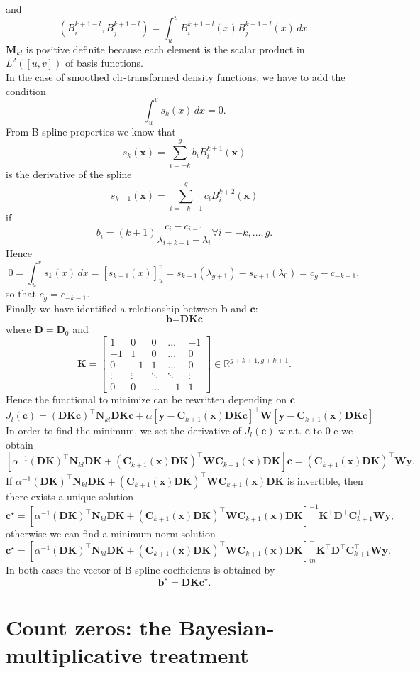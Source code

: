 and \[(B_{i}^{k+1-l}, B_{j}^{k+1-l}) = \int_u^v B_{i}^{k+1-l}(x)B_{j}^{k+1-l}(x) \, dx.\]
$\textbf{M}_{kl}$ is positive definite because each element is the scalar product in $L^2([u,v])$ of basis functions. \\
In the case of  smoothed clr-transformed density functions, we have to add the condition
\[\int_u^v s_k(x) \, dx = 0.\] 
From B-spline properties we know that 
\[  s_k(\textbf{x})=\sum\limits_{i=-k}^{g}b_iB_i^{k+1}(\textbf{x}) \]
is the derivative of the spline
\[  s_{k+1}(\textbf{x})=\sum\limits_{i=-k-1}^{g}c_iB_i^{k+2}(\textbf{x}) \]
if
\[b_i = (k+1)\frac{c_i-c_{i-1}}{\lambda_{i+k+1}-\lambda_{i}} \forall i = -k, \dots, g.\]
Hence 
\[ 0 = \int_u^v s_k(x) \, dx = [s_{k+1}(x)]_u^v = s_{k+1}(\lambda_{g+1})-s_{k+1}(\lambda_{0}) = c_g-c_{-k-1},\]
so that $c_g = c_{-k-1}$.\\
Finally we have identified a relationship between $\textbf{b}$ and $\textbf{c}$:
\[\textbf{b} = \textbf{D}\textbf{K}\textbf{c}\] 
where $ \textbf{D} = \textbf{D}_0$ and
\[  \textbf{K} =
\begin{bmatrix}
1 &0&0& \dots  & -1 \\
-1 &1&0& \dots  & 0 \\
0 &-1&1& \dots  & 0 \\
\vdots &\vdots & \ddots & \ddots& \vdots \\
0 &0 & \dots&-1  & 1
\end{bmatrix} \in \mathbb{R}^{g+k+1, g+k+1}. \]
Hence the functional to minimize can be rewritten depending on $\textbf{c}$
\[J_l(\textbf{c}) = (\textbf{D}\textbf{K}\textbf{c})^\top \textbf{N}_{kl}\textbf{D}\textbf{K}\textbf{c} + \alpha [\textbf{y}-\textbf{C}_{k+1}(\textbf{x})\textbf{D}\textbf{K}\textbf{c}]^\top \textbf{W} [\textbf{y}-\textbf{C}_{k+1}(\textbf{x})\textbf{D}\textbf{K}\textbf{c}]\]
In order to find the minimum, we set the derivative of $J_l(\textbf{c})$ w.r.t. $\textbf{c}$ to 0 e we obtain
\[ [\alpha^{-1}(\textbf{D}\textbf{K})^\top \textbf{N}_{kl} \textbf{D}\textbf{K}+ (\textbf{C}_{k+1}(\textbf{x})\textbf{D}\textbf{K})^\top\textbf{W}\textbf{C}_{k+1}(\textbf{x})\textbf{D}\textbf{K}]\textbf{c} = (\textbf{C}_{k+1}(\textbf{x})\textbf{D}\textbf{K})^\top \textbf{W}\textbf{y}.\]
If $\alpha^{-1}(\textbf{D}\textbf{K})^\top \textbf{N}_{kl} \textbf{D}\textbf{K}+ (\textbf{C}_{k+1}(\textbf{x})\textbf{D}\textbf{K})^\top\textbf{W}\textbf{C}_{k+1}(\textbf{x})\textbf{D}\textbf{K}$ is invertible, then there exists a unique solution 
\[\textbf{c}^\star = [\alpha^{-1}(\textbf{D}\textbf{K})^\top \textbf{N}_{kl} \textbf{D}\textbf{K}+ (\textbf{C}_{k+1}(\textbf{x})\textbf{D}\textbf{K})^\top\textbf{W}\textbf{C}_{k+1}(\textbf{x})\textbf{D}\textbf{K}]^{-1}\textbf{K}^\top\textbf{D}^\top\textbf{C}_{k+1}^\top \textbf{W}\textbf{y},\]
otherwise we can find a minimum norm solution
\[\textbf{c}^\star = [\alpha^{-1}(\textbf{D}\textbf{K})^\top \textbf{N}_{kl} \textbf{D}\textbf{K}+ (\textbf{C}_{k+1}(\textbf{x})\textbf{D}\textbf{K})^\top\textbf{W}\textbf{C}_{k+1}(\textbf{x})\textbf{D}\textbf{K}]_{m}^{-}\textbf{K}^\top\textbf{D}^\top\textbf{C}_{k+1}^\top \textbf{W}\textbf{y}.\]
In both cases the vector of B-spline coefficients is obtained by
\[\textbf{b}^\star = \textbf{D}\textbf{K}\textbf{c}^\star.\] 

\section{Count zeros: the Bayesian-multiplicative treatment} \label{BM}
